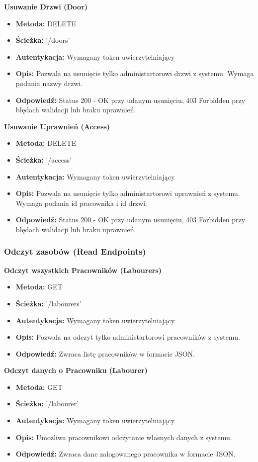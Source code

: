 \textbf{\large{Usuwanie Drzwi (Door)}}
\begin{itemize}
    \item \textbf{Metoda:} DELETE
    \item \textbf{Ścieżka:} '/doors'
    \item \textbf{Autentykacja:} Wymagany token uwierzytelniający
    \item \textbf{Opis:} Pozwala na usunięcie tylko administartorowi drzwi z systemu. Wymaga podania nazwy drzwi.
    \item \textbf{Odpowiedź:} Status 200 - OK przy udanym usunięciu, 403 Forbidden przy błędach walidacji lub braku uprawnień.
\end{itemize}

\textbf{\large{Usuwanie Uprawnień (Access)}}
\begin{itemize}
    \item \textbf{Metoda:} DELETE
    \item \textbf{Ścieżka:} '/access'
    \item \textbf{Autentykacja:} Wymagany token uwierzytelniający
    \item \textbf{Opis:} Pozwala na usunięcie tylko administartorowi uprawnień z systemu. Wymaga podania id pracownika i id drzwi.
    \item \textbf{Odpowiedź:} Status 200 - OK przy udanym usunięciu, 403 Forbidden przy błędach walidacji lub braku uprawnień.
\end{itemize}

\subsubsection{\textbf{\large{Odczyt zasobów (Read Endpoints)}}}
\textbf{\large{Odczyt wszystkich Pracowników (Labourers)}}
\begin{itemize}
    \item \textbf{Metoda:} GET
    \item \textbf{Ścieżka:} '/labourers'
    \item \textbf{Autentykacja:} Wymagany token uwierzytelniający
    \item \textbf{Opis:} Pozwala na odczyt tylko administartorowi pracowników z systemu.
    \item \textbf{Odpowiedź:} Zwraca listę pracowników w formacie JSON.
\end{itemize}

\textbf{\large{Odczyt danych o Pracowniku (Labourer)}}
\begin{itemize}
    \item \textbf{Metoda:} GET
    \item \textbf{Ścieżka:} '/labourer'
    \item \textbf{Autentykacja:} Wymagany token uwierzytelniający
    \item \textbf{Opis:} Umozliwa pracownikowi odczytanie własnych danych z systemu.
    \item \textbf{Odpowiedź:} Zwraca dane zalogowanego pracownika w formacie JSON.
\end{itemize}

